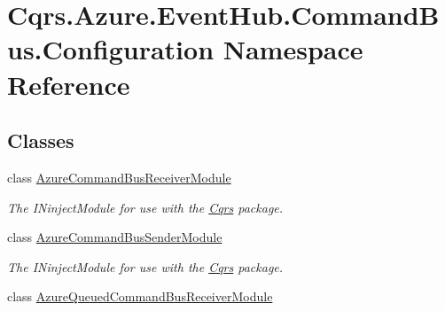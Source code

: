 \hypertarget{namespaceCqrs_1_1Azure_1_1EventHub_1_1CommandBus_1_1Configuration}{}\section{Cqrs.\+Azure.\+Event\+Hub.\+Command\+Bus.\+Configuration Namespace Reference}
\label{namespaceCqrs_1_1Azure_1_1EventHub_1_1CommandBus_1_1Configuration}
\subsection*{Classes}
\begin{DoxyCompactItemize}
\item 
class \hyperlink{classCqrs_1_1Azure_1_1EventHub_1_1CommandBus_1_1Configuration_1_1AzureCommandBusReceiverModule}{Azure\+Command\+Bus\+Receiver\+Module}
\begin{DoxyCompactList}\small\item\em The I\+Ninject\+Module for use with the \hyperlink{namespaceCqrs}{Cqrs} package. \end{DoxyCompactList}\item 
class \hyperlink{classCqrs_1_1Azure_1_1EventHub_1_1CommandBus_1_1Configuration_1_1AzureCommandBusSenderModule}{Azure\+Command\+Bus\+Sender\+Module}
\begin{DoxyCompactList}\small\item\em The I\+Ninject\+Module for use with the \hyperlink{namespaceCqrs}{Cqrs} package. \end{DoxyCompactList}\item 
class \hyperlink{classCqrs_1_1Azure_1_1EventHub_1_1CommandBus_1_1Configuration_1_1AzureQueuedCommandBusReceiverModule}{Azure\+Queued\+Command\+Bus\+Receiver\+Module}
\end{DoxyCompactItemize}
